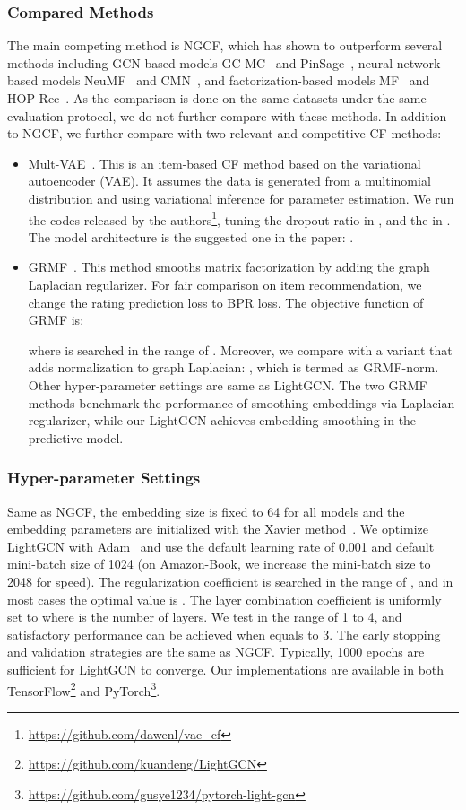 \documentclass[sigconf]{acmart}
\theoremstyle{definition}
\begin{document}
\subsubsection{Compared Methods} The main competing method is NGCF, which has shown to outperform several methods including GCN-based models GC-MC~\cite{GC-MC} and PinSage~\cite{PinSage}, neural network-based models NeuMF~\cite{NCF} and CMN~\cite{CMN}, and factorization-based models MF~\cite{BPRMF} and HOP-Rec~\cite{HOP-rec}.
As the comparison is done on the same datasets under the same evaluation protocol, we do not further compare with these methods. In addition to NGCF, we further compare with two relevant and competitive CF methods:
\begin{itemize}[leftmargin=*]
\item Mult-VAE~\cite{VACF}. This is an item-based CF method based on the variational autoencoder (VAE). 
It assumes the data is generated from a multinomial distribution and using variational inference for parameter estimation. 
We run the codes released by the authors\footnote{\url{https://github.com/dawenl/vae_cf}}, tuning the dropout ratio in , and the  in . The model architecture is the suggested one in the paper: . 
\item GRMF~\cite{rao2015collaborative}. This method smooths matrix factorization by adding the graph Laplacian regularizer.
For fair comparison on item recommendation, we change the rating prediction loss to BPR loss. The objective function of GRMF is:

where  is searched in the range of . 
Moreover, we compare with a variant that adds normalization to graph Laplacian: , which is termed as GRMF-norm. 
Other hyper-parameter settings are same as LightGCN. 
The two GRMF methods benchmark the performance of smoothing embeddings via Laplacian regularizer, while our LightGCN achieves embedding smoothing in the predictive model. 
\end{itemize}

\subsubsection{Hyper-parameter Settings} 
Same as NGCF, the embedding size is fixed to 64 for all models and the embedding parameters are initialized with the Xavier method~\cite{Xarvier}. We optimize LightGCN with Adam~\cite{Adam} and use the default learning rate of 0.001 and default mini-batch size of 1024 (on Amazon-Book, we increase the mini-batch size to 2048 for speed). The  regularization coefficient  is searched in the range of , and in most cases the optimal value is . 
The layer combination coefficient  is uniformly set to  where  is the number of layers. We test  in the range of 1 to 4, and satisfactory performance can be achieved when  equals to 3. 
The early stopping and validation strategies are the same as NGCF. Typically, 1000 epochs are sufficient for LightGCN to converge. Our implementations are available in both TensorFlow\footnote{\url{https://github.com/kuandeng/LightGCN}} and PyTorch\footnote{\url{https://github.com/gusye1234/pytorch-light-gcn}}. 
\end{document}
